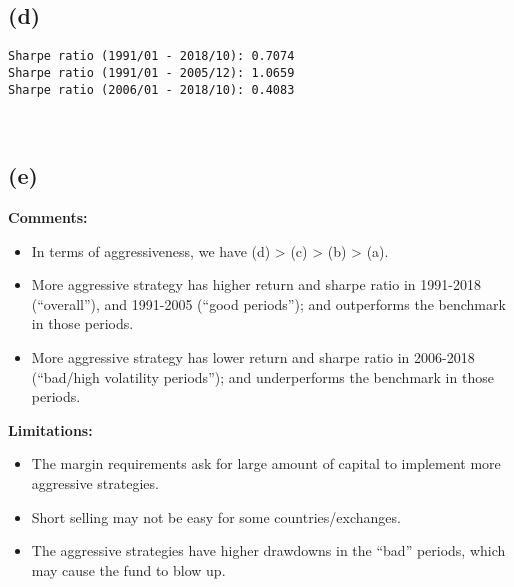 \documentclass[10pt]{article}
\begin{document}
    \subsection{(d)}\label{d}

    \begin{Verbatim}[commandchars=\\\{\}]
Sharpe ratio (1991/01 - 2018/10): 0.7074
Sharpe ratio (1991/01 - 2005/12): 1.0659
Sharpe ratio (2006/01 - 2018/10): 0.4083

    \end{Verbatim}

    \begin{center}
    \end{center}
    { \hspace*{\fill} \\}
    
    \subsection{(e)}\label{e}
    \textbf{Comments:}
    \begin{itemize}
        \item In terms of aggressiveness, we have (d) > (c) > (b) > (a). 
        \item More aggressive strategy has higher return and sharpe ratio in 1991-2018 (``overall''), and 1991-2005 (``good periods''); and outperforms the benchmark in those periods.
        \item More aggressive strategy has lower return and sharpe ratio in 2006-2018 (``bad/high volatility periods''); and underperforms the benchmark in those periods.
    \end{itemize}
    \textbf{Limitations:}
    \begin{itemize}
        \item The margin requirements ask for large amount of capital to implement more aggressive strategies.
        \item Short selling may not be easy for some countries/exchanges.
        \item The aggressive strategies have higher drawdowns in the ``bad'' periods, which may cause the fund to blow up.
    \end{itemize}

    
    
    
    
\end{document}
